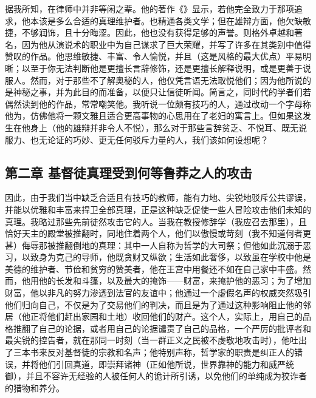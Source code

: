 据我所知，在律师中并非等闲之辈。他的著作《》显示，若他完全致力于那项追求，他本该是多么合适的真理维护者。也精通各类文学；但在雄辩方面，他欠缺敏捷，不够润饰，且十分晦涩。因此，他也没有获得足够的声誉。则格外卓越和著名，因为他从演说术的职业中为自己谋求了巨大荣耀，并写了许多在其类别中值得赞叹的作品。他思维敏捷、丰富、令人愉悦，并且（这是风格的最大优点）平易明晰；以至于你无法判断他是更擅长言辞修饰，还是更擅长解释说明，或是更善于说服人。然而，对于那些不了解奥秘的人，他仅凭言语无法取悦他们；因为他所说的是神秘之事，并为此目的而准备，以便只让信徒听闻。简言之，同时代的学者们若偶然读到他的作品，常常嘲笑他。我听说一位颇有技巧的人，通过改动一个字母称他为，仿佛他将一颗文雅且适合更高事物的心思用在了老妇的寓言上。但如果这发生在他身上（他的雄辩并非令人不悦），那么对于那些言辞贫乏、不悦耳、既无说服力、也无论证的巧妙、更无任何驳斥力量的人，我们该如何设想呢？\par


\subsection{第二章  基督徒真理受到何等鲁莽之人的攻击}

因此，由于我们当中缺乏合适且有技巧的教师，能有力地、尖锐地驳斥公共谬误，并能以优雅和丰富来捍卫全部真理，正是这种缺乏促使一些人冒险攻击他们未知的真理。我略过那些先前徒然攻击它的人。当我在教授修辞学（我应召去那里），且恰好天主的殿堂被推翻时，同地住着两个人，他们以傲慢或苛刻（我不知道何者更甚）侮辱那被推翻倒地的真理：其中一人自称为哲学的大司祭；但他如此沉溺于恶习，以致身为克己的导师，他既贪财又纵欲；生活如此奢侈，以致虽在学校中他是美德的维护者、节俭和贫穷的赞美者，他在王宫中用餐还不如在自己家中丰盛。然而，他用他的长发和斗篷，以及最大的掩饰——财富，来掩护他的恶习；为了增加财富，他以非凡的努力渗透到法官的友谊中；他通过一个虚假名声的权威突然吸引他们归向自己，不仅是为了交易他们的判决，而且是为了通过这种影响阻止他的邻居（他正将他们赶出家园和土地）收回他们的财产。这个人，实际上，用自己的品格推翻了自己的论据，或者用自己的论据谴责了自己的品格，一个严厉的批评者和最尖锐的控告者，就在那同一时刻（当一群正义之民被不虔敬地攻击时），他吐出了三本书来反对基督徒的宗教和名声；他特别声称，哲学家的职责是纠正人的错误，并将他们引回真道，即崇拜诸神（正如他所说，世界靠神的能力和威严统御），并且不容许无经验的人被任何人的诡计所引诱，以免他们的单纯成为狡诈者的猎物和养分。\par

